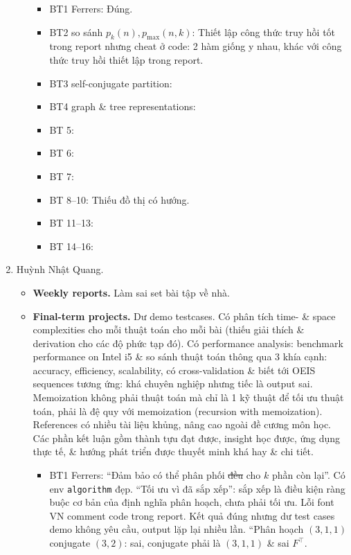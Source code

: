 \documentclass{article}
\begin{document}
\begin{enumerate}
\begin{itemize}
\begin{itemize}
            \item BT1 Ferrers: Đúng.
            \item BT2 so sánh $p_k(n),p_{\max}(n,k)$: Thiết lập công thức truy hồi tốt trong report nhưng cheat ở code: 2 hàm giống y nhau, khác với công thức truy hồi thiết lập trong report.
            \item BT3 self-conjugate partition:
            \item BT4 graph \& tree representations:
            \item BT 5:
            \item BT 6:
            \item BT 7:
            \item BT 8--10: Thiếu đồ thị có hướng.
            \item BT 11--13:
            \item BT 14--16:
        \end{itemize}
    \end{itemize}
    \item {\sc Huỳnh Nhật Quang.}
    \begin{itemize}
        \item {\bf Weekly reports.} Làm sai set bài tập về nhà.
        \item {\bf Final-term projects.} Dư demo testcases. Có phân tích time- \& space complexities cho mỗi thuật toán cho mỗi bài (thiếu giải thích \& derivation cho các độ phức tạp đó). Có performance analysis: benchmark performance on Intel i5 \& so sánh thuật toán thông qua 3 khía cạnh: accuracy, efficiency, scalability, có cross-validation \& biết tới OEIS sequences tương ứng: khá chuyên nghiệp nhưng tiếc là output sai. Memoization không phải thuật toán mà chỉ là 1 kỹ thuật để tối ưu thuật toán, phải là đệ quy với memoization (recursion with memoization). References có nhiều tài liệu khủng, nâng cao ngoài đề cương môn học. Các phần kết luận gồm thành tựu đạt được, insight học được, ứng dụng thực tế, \& hướng phát triển được thuyết minh khá hay \& chi tiết.
        \begin{itemize}
            \item BT1 Ferrers: ``Đảm bảo có thể phân phối \st{đều} cho $k$ phần còn lại''. Có env {\tt algorithm} đẹp. ``Tối ưu vì đã sắp xếp'': sắp xếp là điều kiện ràng buộc cơ bản của định nghĩa phân hoạch, chưa phải tối ưu. Lỗi font VN comment code trong report. Kết quả đúng nhưng dư test cases demo không yêu cầu, output lặp lại nhiều lần. ``Phân hoạch $(3,1,1)$ conjugate $(3,2)$: sai, conjugate phải là $(3,1,1)$ \& sai $F^\top$.

\end{itemize}
\end{itemize}
\end{enumerate}
\end{document}

